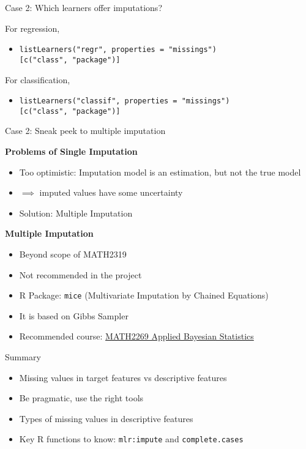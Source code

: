 \documentclass[ignorenonframetext,]{beamer}
\providecommand{\tightlist}{%
  \setlength{\itemsep}{0pt}\setlength{\parskip}{0pt}}
\begin{document}
\begin{frame}[fragile]{Case 2: Which learners offer imputations?}

For regression,

\begin{itemize}
\tightlist
\item
  \texttt{listLearners("regr",\ properties\ =\ "missings"){[}c("class",\ "package"){]}}
\end{itemize}

For classification,

\begin{itemize}
\tightlist
\item
  \texttt{listLearners("classif",\ properties\ =\ "missings"){[}c("class",\ "package"){]}}
\end{itemize}

\end{frame}

\begin{frame}[fragile]{Case 2: Sneak peek to multiple imputation}

\textbf{Problems of Single Imputation}

\begin{itemize}
\tightlist
\item
  Too optimistic: Imputation model is an estimation, but not the true
  model
\item
  \(\implies\) imputed values have some uncertainty
\item
  Solution: Multiple Imputation
\end{itemize}

\textbf{Multiple Imputation}

\begin{itemize}
\tightlist
\item
  Beyond scope of MATH2319
\item
  Not recommended in the project
\item
  R Package: \texttt{mice} (Multivariate Imputation by Chained
  Equations)
\item
  It is based on Gibbs Sampler
\item
  Recommended course:
  \href{http://www1.rmit.edu.au/courses/050645}{MATH2269 Applied
  Bayesian Statistics}
\end{itemize}

\end{frame}

\begin{frame}[fragile]{Summary}

\begin{itemize}
\tightlist
\item
  Missing values in target features vs descriptive features
\item
  Be pragmatic, use the right tools
\item
  Types of missing values in descriptive features
\item
  Key R functions to know: \texttt{mlr:impute} and
  \texttt{complete.cases}
\end{itemize}

\end{frame}
\end{document}
